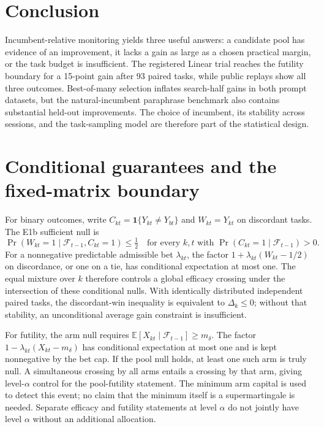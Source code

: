 \documentclass[11pt]{article}
\begin{document}
\section{Conclusion}
Incumbent-relative monitoring yields three useful answers: a candidate pool has evidence of an improvement, it lacks a gain as large as a chosen practical margin, or the task budget is insufficient. The registered Linear trial reaches the futility boundary for a 15-point gain after 93 paired tasks, while public replays show all three outcomes. Best-of-many selection inflates search-half gains in both prompt datasets, but the natural-incumbent paraphrase benchmark also contains substantial held-out improvements. The choice of incumbent, its stability across sessions, and the task-sampling model are therefore part of the statistical design.




\appendix
\section{Conditional guarantees and the fixed-matrix boundary}
For binary outcomes, write $C_{kt}=\mathbf 1\{Y_{kt}\ne Y_{bt}\}$ and $W_{kt}=Y_{kt}$ on discordant tasks. The E1b sufficient null is
\begin{equation}
 \Pr(W_{kt}=1\mid\mathcal F_{t-1},C_{kt}=1)\leq\tfrac12
 \quad\text{for every }k,t\text{ with }\Pr(C_{kt}=1\mid\mathcal F_{t-1})>0.
\end{equation}
For a nonnegative predictable admissible bet $\lambda_{kt}$, the factor $1+\lambda_{kt}(W_{kt}-1/2)$ on discordance, or one on a tie, has conditional expectation at most one. The equal mixture over $k$ therefore controls a global efficacy crossing under the intersection of these conditional nulls. With identically distributed independent paired tasks, the discordant-win inequality is equivalent to $\Delta_k\leq0$; without that stability, an unconditional average gain constraint is insufficient.

For futility, the arm null requires $\mathbb E[X_{kt}\mid\mathcal F_{t-1}]\geq m_\delta$. The factor $1-\lambda_{kt}(X_{kt}-m_\delta)$ has conditional expectation at most one and is kept nonnegative by the bet cap. If the pool null holds, at least one such arm is truly null. A simultaneous crossing by all arms entails a crossing by that arm, giving level-$\alpha$ control for the pool-futility statement. The minimum arm capital is used to detect this event; no claim that the minimum itself is a supermartingale is needed. Separate efficacy and futility statements at level $\alpha$ do not jointly have level $\alpha$ without an additional allocation.
\end{document}
